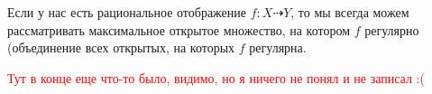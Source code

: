 	 Если у нас есть рациональное отображение $f\colon X \dashrightarrow Y$, то мы всегда можем рассматривать максимальное открытое множество, на котором $f$ регулярно (объединение всех открытых, на которых $f$ регулярна. 

	 \textcolor{red}{Тут в конце еще что-то было, видимо, но я ничего не понял и не записал :(}

	 



